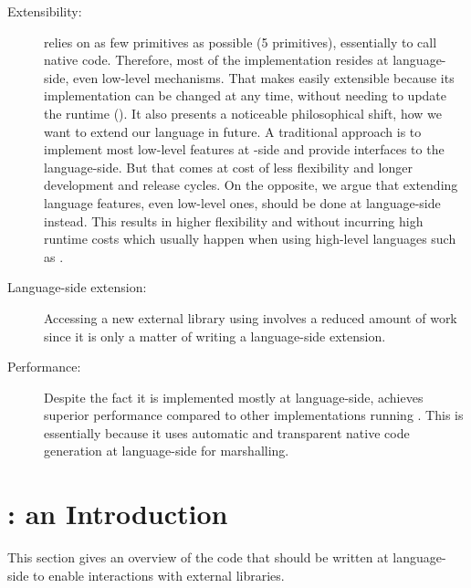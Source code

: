 \begin{description}
	\item[Extensibility:] \NBFFI relies on as few \VM primitives as possible (5 primitives), essentially to call native code. 
	Therefore, most of the implementation resides at language-side, even low-level mechanisms.
	That makes \NBFFI easily extensible because its implementation can be changed at any time, without needing to update the runtime (\VM).
	It also presents a noticeable philosophical shift, how we want to extend our language in future.
	A traditional approach is to implement most low-level features at \VM-side and provide interfaces to the language-side.
	But that comes at cost of less flexibility and longer development and release cycles.
	On the opposite, we argue that extending language features, even low-level ones, should be done at language-side instead.
	This results in higher flexibility and without incurring high runtime costs which usually happen when using high-level languages such as \PH.
	
	\item[Language-side extension:] Accessing a new external library using \NBFFI involves a reduced amount of work since it is only a matter of writing a language-side extension.

	\item[Performance:] Despite the fact it is implemented mostly at language-side, \NBFFI achieves superior performance compared to other \FFI implementations running \PH.
    This is essentially because it uses automatic and transparent native code generation at language-side for marshalling.
\end{description}


\section{\NBFFI: an Introduction}

This section gives an overview of the code that should be written at language-side
to enable interactions with external libraries.


